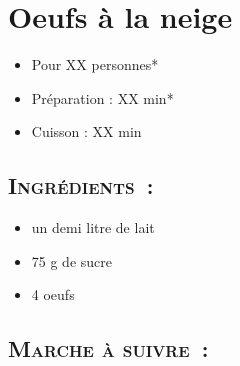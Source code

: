\section{Oeufs à la neige}

\begin{itemize}
\item Pour XX personnes*		%
\item Préparation : XX min*		%
\item Cuisson : XX min			%
\end{itemize}

\subsection*{\textsc{Ingrédients~:}}

\begin{itemize}
\item un demi litre de lait
\item 75 g de sucre
\item 4 oeufs
\end{itemize}


\subsection*{\textsc{Marche à suivre~:}}

